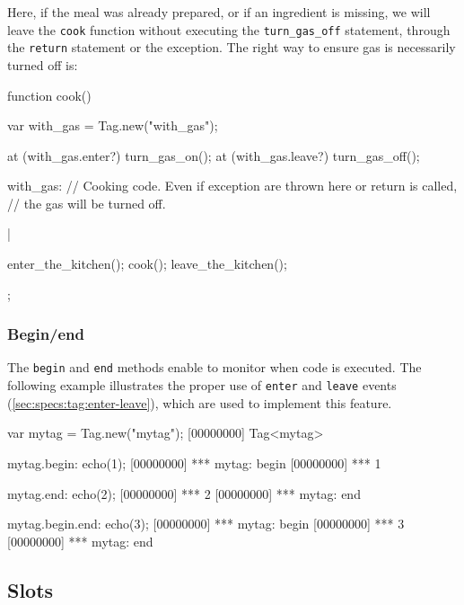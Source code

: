 Here, if the meal was already prepared, or if an
ingredient is missing, we will leave the \lstinline|cook| function
without executing the \lstinline|turn_gas_off| statement, through the
\lstinline|return| statement or the exception. The right way to ensure
gas is necessarily turned off is:

\begin{urbiscript}[firstnumber=last]
{
  function cook()
  {
    var with_gas = Tag.new("with_gas");

    at (with_gas.enter?)
      turn_gas_on();
    at (with_gas.leave?)
      turn_gas_off();

    with_gas: {
      // Cooking code. Even if exception are thrown here or return is called,
      // the gas will be turned off.
    }
  }|

  enter_the_kitchen();
  cook();
  leave_the_kitchen();
};
\end{urbiscript}

\subsubsection{Begin/end}
\label{sec:specs:tag:begin-end}

The \lstinline|begin| and \lstinline|end| methods enable to monitor
when code is executed.  The following example illustrates the proper
use of \lstinline|enter| and \lstinline|leave| events
(\autoref{sec:specs:tag:enter-leave}), which are used to implement
this feature.

\begin{urbiscript}[firstnumber=last]
var mytag = Tag.new("mytag");
[00000000] Tag<mytag>

mytag.begin: echo(1);
[00000000] *** mytag: begin
[00000000] *** 1

mytag.end: echo(2);
[00000000] *** 2
[00000000] *** mytag: end

mytag.begin.end: echo(3);
[00000000] *** mytag: begin
[00000000] *** 3
[00000000] *** mytag: end
\end{urbiscript}

\subsection{Slots}

